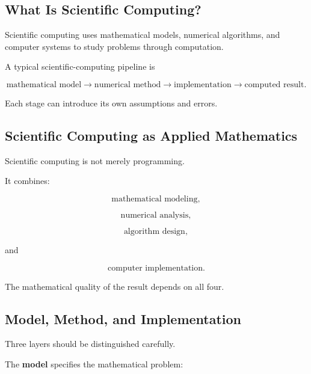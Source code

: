 \subsection{What Is Scientific Computing?}
\label{subsec:what-is-scientific-computing}

Scientific computing uses mathematical models, numerical algorithms, and
computer systems to study problems through computation.

A typical scientific-computing pipeline is

\[
\boxed{
\text{mathematical model}
\longrightarrow
\text{numerical method}
\longrightarrow
\text{implementation}
\longrightarrow
\text{computed result}.
}
\]

Each stage can introduce its own assumptions and errors.

\subsection{Scientific Computing as Applied Mathematics}
\label{subsec:scientific-computing-applied-mathematics}

Scientific computing is not merely programming.

It combines:

\[
\boxed{
\text{mathematical modeling},
}
\]

\[
\boxed{
\text{numerical analysis},
}
\]

\[
\boxed{
\text{algorithm design},
}
\]

and

\[
\boxed{
\text{computer implementation}.
}
\]

The mathematical quality of the result depends on all four.

\subsection{Model, Method, and Implementation}
\label{subsec:model-method-implementation}

Three layers should be distinguished carefully.

The \textbf{model} specifies the mathematical problem:

